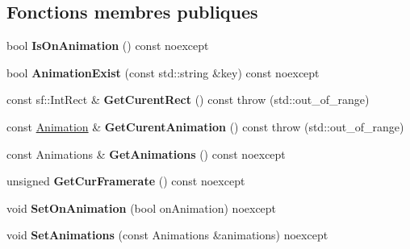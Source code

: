 \subsection*{Fonctions membres publiques}
\begin{DoxyCompactItemize}
\item 
\mbox{\label{classmy_1_1AnimatedObject_a480119012567dd5f2012b61eaf6c8273}} 
bool {\bfseries Is\+On\+Animation} () const noexcept
\item 
\mbox{\label{classmy_1_1AnimatedObject_a49756a252ea70f3113619f1666205794}} 
bool {\bfseries Animation\+Exist} (const std\+::string \&key) const noexcept
\item 
\mbox{\label{classmy_1_1AnimatedObject_a6aabe49b2c026eeb609c1a558141e241}} 
const sf\+::\+Int\+Rect \& {\bfseries Get\+Curent\+Rect} () const  throw (std\+::out\+\_\+of\+\_\+range)
\item 
\mbox{\label{classmy_1_1AnimatedObject_ab5a32b5d7b30e6ca594d824a8228b0df}} 
const \hyperlink{structmy_1_1AnimatedObject_1_1Animation}{Animation} \& {\bfseries Get\+Curent\+Animation} () const  throw (std\+::out\+\_\+of\+\_\+range)
\item 
\mbox{\label{classmy_1_1AnimatedObject_a41aafdead3b867bd67ce633fb85ed9af}} 
const Animations \& {\bfseries Get\+Animations} () const noexcept
\item 
\mbox{\label{classmy_1_1AnimatedObject_aa786264957518722eb2b847fa725e3b1}} 
unsigned {\bfseries Get\+Cur\+Framerate} () const noexcept
\item 
\mbox{\label{classmy_1_1AnimatedObject_a0e01eea3aec59eace02d377bcf3f528d}} 
void {\bfseries Set\+On\+Animation} (bool on\+Animation) noexcept
\item 
\mbox{\label{classmy_1_1AnimatedObject_a528df17be1a66e7ead821c3a0de3609b}} 
void {\bfseries Set\+Animations} (const Animations \&animations) noexcept
\item 
\mbox{\label{classmy_1_1AnimatedObject_aa280439191dcecdb95ca210a5d0901da}} 

\end{DoxyCompactItemize}

